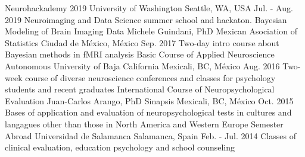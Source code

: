 \begin{cvcourses}
    \cvcourse
        {Neurohackademy 2019}
        {}
        {University of Washington}
        {Seattle, WA, USA}
        {Jul. - Aug. 2019}
        {Neuroimaging and Data Science summer school and hackaton.}
    \cvcourse
        {Bayesian Modeling of Brain Imaging Data}
        {Michele Guindani, PhD}
        {Mexican Asociation of Statistics}
        {Ciudad de México, México}
        {Sep. 2017}
        {Two-day intro course about Bayesian methods in fMRI analysis}
    \cvcourse
        {Basic Course of Applied Neuroscience}
        {}
        {Autonomous University of Baja California}
        {Mexicali, BC, México}
        {Aug. 2016}
        {Two-week course of diverse neuroscience conferences and
            classes for psychology students and recent graduates}
    \cvcourse
        {International Course of Neuropsychological Evaluation}
        {Juan-Carlos Arango, PhD}
        {Sinapsis}
        {Mexicali, BC, México}
        {Oct. 2015}
        {Bases of application and evaluation of
            neuropsychological tests in cultures and langagues other
            than those in North America and Western Europe}
    \cvcourse
        {Semester Abroad}
        {}
        {Universidad de Salamanca}
        {Salamanca, Spain}
        {Feb. - Jul. 2014}
        {Classes of clinical evaluation, education psychology and
            school counseling}
\end{cvcourses}


